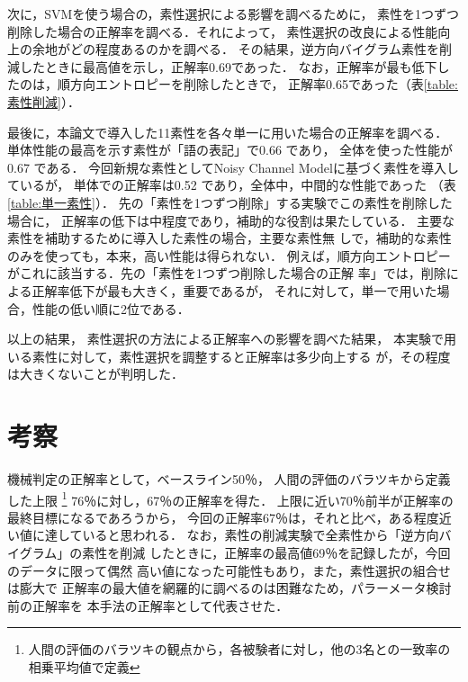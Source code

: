 \documentclass[japanese]{jnlp_1.3e}
\begin{document}
次に，SVMを使う場合の，素性選択による影響を調べるために，
素性を1つずつ削除した場合の正解率を調べる．それによって，
素性選択の改良による性能向上の余地がどの程度あるのかを調べる．
その結果，逆方向バイグラム素性を削減したときに最高値を示し，正解率0.69であった．
なお，正解率が最も低下したのは，順方向エントロピーを削除したときで，
正解率0.65であった（表\ref{table:素性削減}）．

\begin{table}[t]

\end{table}

最後に，本論文で導入した11素性を各々単一に用いた場合の正解率を調べる．
単体性能の最高を示す素性が「語の表記」で0.66 であり，
全体を使った性能が 0.67 である．
今回新規な素性としてNoisy Channel Modelに基づく素性を導入しているが，
単体での正解率は0.52 であり，全体中，中間的な性能であった
（表\ref{table:単一素性}）．
先の「素性を1つずつ削除」する実験でこの素性を削除した場合に，
正解率の低下は中程度であり，補助的な役割は果たしている．
主要な素性を補助するために導入した素性の場合，主要な素性無
しで，補助的な素性のみを使っても，本来，高い性能は得られない．
例えば，順方向エントロピーがこれに該当する．先の「素性を1つずつ削除した場合の正解
率」では，削除による正解率低下が最も大きく，重要であるが，
それに対して，単一で用いた場合，性能の低い順に2位である．

以上の結果，
素性選択の方法による正解率への影響を調べた結果，
本実験で用いる素性に対して，素性選択を調整すると正解率は多少向上する
が，その程度は大きくないことが判明した．



\section{考察}

機械判定の正解率として，ベースライン50{\kern0pt}％，
人間の評価のバラツキから定義した上限
\footnote{人間の評価のバラツキの観点から，各被験者に対し，他の3名との一致率の
相乗平均値で定義} 76{\kern0pt}％に対し，67{\kern0pt}％の正解率を得た．
上限に近い70{\kern0pt}％前半が正解率の最終目標になるであろうから，
今回の正解率67{\kern0pt}％は，それと比べ，ある程度近い値に達していると思われる．
なお，素性の削減実験で全素性から「逆方向バイグラム」の素性を削減
したときに，正解率の最高値69{\kern0pt}％を記録したが，今回のデータに限って偶然
高い値になった可能性もあり，また，素性選択の組合せは膨大で
正解率の最大値を網羅的に調べるのは困難なため，パラーメータ検討前の正解率を
本手法の正解率として代表させた．
\end{document}
